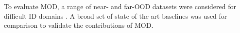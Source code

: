 
To evaluate MOD, a range of near- and far-OOD datasets were considered for difficult ID domains \cite{yang2022openood,winkens2020contrastive}. A broad set of state-of-the-art baselines was used for comparison to validate the contributions of MOD.

